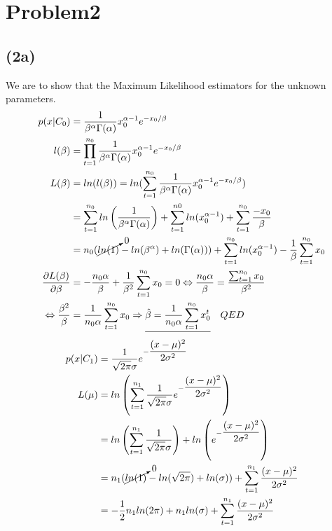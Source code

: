 \documentclass[12pt, letterpaper]{article}
\begin{document}
  \section*{Problem2}
    \subsection*{(2a)}
      We are to show that the Maximum Likelihood estimators for the unknown parameters.
      \begin{align*}
        p(x|C_0) & = \dfrac{1}{\beta^\alpha\Gamma(\alpha)}x_{0}^{\alpha-1}e^{-x_{0}/\beta}\\
        l(\beta) & = \prod_{t=1}^{n_0} \dfrac{1}{\beta^\alpha \Gamma(\alpha)}x_{0}^{\alpha-1}e^{-x_{0}/\beta}\\
        L(\beta) & = ln(l(\beta)) = ln(\sum_{t=1}^{n_0}\dfrac{1}{\beta^\alpha \Gamma(\alpha)}x_{0}^{\alpha-1}e^{-x_{0}/\beta})\\
        & =\sum_{t=1}^{n_0}ln \left( \dfrac{1}{\beta^\alpha \Gamma(\alpha)} \right) + \sum_{t=1}^{n0}ln(x_{0}^{\alpha-1}) + \sum_{t=1}^{n_0} \dfrac{-x_0}{\beta}\\
        & = n_0( \cancelto{0}{ln(1)} - ln(\beta^\alpha) + ln(\Gamma(\alpha))) + \sum_{t=1}^{n_0} ln(x_{0}^{\alpha-1}) - \dfrac{1}{\beta}\sum_{t=1}^{n_0}x_0 \\
        \dfrac{\partial L(\beta)}{\partial\beta} & = -\dfrac{n_0 \alpha}{\beta} + \dfrac{1}{\beta^2}\sum_{t=1}^{n_0}x_0 = 0 \Leftrightarrow \dfrac{n_0 \alpha}{\beta} = \dfrac{\sum_{t=1}^{n_0}x_0}{\beta^2}\\
        \Leftrightarrow \dfrac{\beta^2}{\beta} & = \dfrac{1}{n_0 \alpha}\sum_{t=1}^{n_0}x_0 \Rightarrow \underline{\hat{\beta} = \dfrac{1}{n_0 \alpha}\sum_{t=1}^{n_0}x_0^t} \quad QED
      \end{align*}
      \begin{align*}
        p(x|C_1) & = \dfrac{1}{\sqrt{2\pi}\sigma}e^{-\dfrac{(x-\mu)^2}{2\sigma^2}} \\
        L(\mu) & = ln \left( \sum_{t=1}^{n_1} \dfrac{1}{\sqrt{2\pi}\sigma}e^{-\dfrac{(x-\mu)^2}{2\sigma^2}}\right) \\
        & = ln \left(\sum_{t=1}^{n_1} \dfrac{1}{\sqrt{2\pi}\sigma} \right) + ln\left(e^{-\dfrac{(x-\mu)^2}{2\sigma^2}} \right)\\
        & = n_1(\cancelto{0}{ln(1)}-ln(\sqrt{2\pi}) + ln(\sigma)) + \sum_{t=1}^{n_1}\dfrac{(x-\mu)^2}{2\sigma^2} \\
        & = -\dfrac{1}{2}n_1 ln(2\pi) + n_1 ln(\sigma) + \sum_{t=1}^{n_1} \dfrac{(x-\mu)^2}{2\sigma^2}
      \end{align*}
\end{document}
